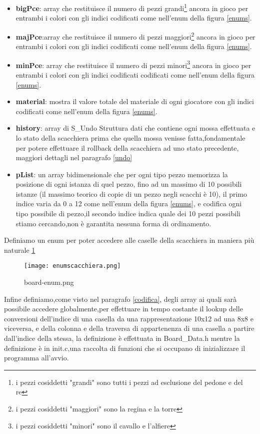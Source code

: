 \begin{itemize}
    \item \textbf{bigPce}: array che restituisce il numero di pezzi grandi\footnote{i pezzi cosiddetti "grandi" sono tutti i pezzi ad esclusione del pedone e del re} ancora in gioco  per entrambi i colori con gli indici codificati  come nell'enum della figura \ref{enums}.
    \item \textbf{majPce}:array che restituisce il numero di pezzi maggiori\footnote{i pezzi cosiddetti "maggiori" sono la regina e la torre} ancora in gioco  per entrambi i colori con gli indici codificati come nell'enum della figura \ref{enums}.
    \item \textbf{minPce}: array che restituisce il numero di pezzi minori\footnote{i pezzi cosiddetti "minori" sono il cavallo e l'alfiere} ancora in gioco  per entrambi i colori con gli indici codificati codificati come nell'enum della figura \ref{enums}.
    \item \textbf{material}: mostra il valore totale del materiale di ogni giocatore con gli indici codificati  come nell'enum della figura \ref{enums}.
    \item \textbf{history}: array di S\_Undo Struttura dati che contiene ogni mossa effettuata e lo stato della scacchiera prima che quella mossa venisse fatta,fondamentale per potere effettuare
          il rollback della scacchiera ad uno stato precedente, maggiori dettagli nel paragrafo \ref{undo}
    \item \textbf{pList}: un array bidimensionale  che per ogni tipo  pezzo memorizza la posizione di ogni istanza di quel pezzo, fino ad un massimo di 10 possibili istanze (il massimo teorico di copie di un pezzo negli scacchi è 10),
          il primo indice varia da 0 a 12 come nell'enum della figura \ref{enums}, e codifica ogni tipo possibile di pezzo,il secondo indice indica quale dei 10 pezzi possibili stiamo cercando,non è garantita nessuna forma
          di ordinamento.
\end{itemize}

Definiamo un enum per poter accedere alle caselle della scacchiera in maniera più naturale \ref{boardenum}
\begin{figure}[H]
    \centering
    \texttt{[image: enumscacchiera.png]}
    \caption{ board-enum.png}
    \label{boardenum}
\end{figure}

Infine definiamo,come visto nel paragrafo \ref{codifica}, degli array ai quali sarà possibile accedere globalmente,per effettuare in tempo costante il lookup delle conversioni dell'indice di una casella
da una rappresentazione 10x12 ad una 8x8 e viceversa, e della colonna e della traversa di appartenenza di una casella a partire dall'indice della stessa, la definizione è effettuata in Board\_Data.h mentre la definizione
è in init.c,una raccolta di funzioni che si occupano di inizializzare il programma all'avvio.

